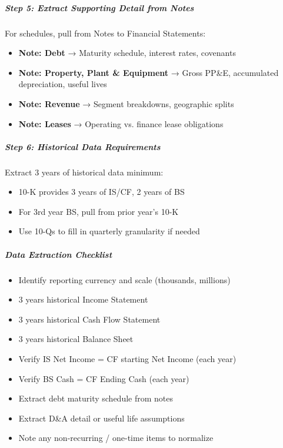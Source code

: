 \documentclass[11pt]{article}
\begin{document}
\subparagraph{Step 5: Extract Supporting Detail from Notes}\mbox{}\par

For schedules, pull from Notes to Financial Statements:

\begin{itemize}[leftmargin=*,itemsep=2pt,topsep=2pt]
\item {} \textbf{Note: Debt} → Maturity schedule, interest rates, covenants
\item {} \textbf{Note: Property, Plant \& Equipment} → Gross PP\&E, accumulated depreciation, useful lives
\item {} \textbf{Note: Revenue} → Segment breakdowns, geographic splits
\item {} \textbf{Note: Leases} → Operating vs. finance lease obligations
\end{itemize}

\subparagraph{Step 6: Historical Data Requirements}\mbox{}\par

Extract 3 years of historical data minimum:

\begin{itemize}[leftmargin=*,itemsep=2pt,topsep=2pt]
\item {} 10-K provides 3 years of IS/CF, 2 years of BS
\item {} For 3rd year BS, pull from prior year's 10-K
\item {} Use 10-Qs to fill in quarterly granularity if needed
\end{itemize}

\subparagraph{Data Extraction Checklist}\mbox{}\par

\begin{itemize}[leftmargin=*,itemsep=2pt,topsep=2pt]
\item {} Identify reporting currency and scale (thousands, millions)
\item {} 3 years historical Income Statement
\item {} 3 years historical Cash Flow Statement
\item {} 3 years historical Balance Sheet
\item {} Verify IS Net Income = CF starting Net Income (each year)
\item {} Verify BS Cash = CF Ending Cash (each year)
\item {} Extract debt maturity schedule from notes
\item {} Extract D\&A detail or useful life assumptions
\item {} Note any non-recurring / one-time items to normalize
\end{itemize}
\end{document}
